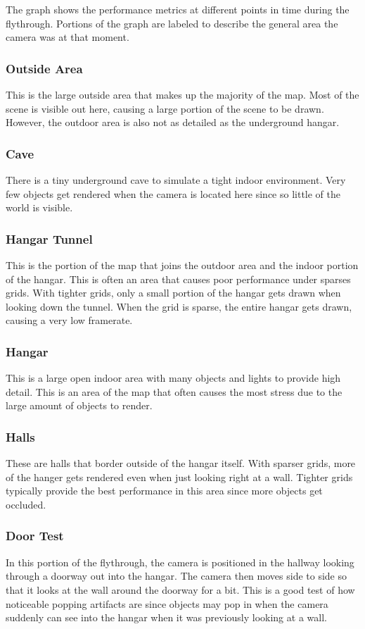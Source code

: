 \documentclass[12pt]{ucthesis}
\begin{document}
The graph shows the performance metrics at different points in time during the flythrough.
Portions of the graph are labeled to describe the general area the camera was at that moment.

\subsubsection{Outside Area}
This is the large outside area that makes up the majority of the map.
Most of the scene is visible out here, causing a large portion of the scene to be drawn.
However, the outdoor area is also not as detailed as the underground hangar.

\subsubsection{Cave}
There is a tiny underground cave to simulate a tight indoor environment.
Very few objects get rendered when the camera is located here since so little of the world is visible.

\subsubsection{Hangar Tunnel}
This is the portion of the map that joins the outdoor area and the indoor portion of the hangar.
This is often an area that causes poor performance under sparses grids.
With tighter grids, only a small portion of the hangar gets drawn when looking down the tunnel.
When the grid is sparse, the entire hangar gets drawn, causing a very low framerate.

\subsubsection{Hangar}
This is a large open indoor area with many objects and lights to provide high detail.
This is an area of the map that often causes the most stress due to the large amount of objects to render.

\subsubsection{Halls}
These are halls that border outside of the hangar itself.
With sparser grids, more of the hanger gets rendered even when just looking right at a wall.
Tighter grids typically provide the best performance in this area since more objects get occluded.

\subsubsection{Door Test}
In this portion of the flythrough, the camera is positioned in the hallway looking through a doorway out into the hangar.
The camera then moves side to side so that it looks at the wall around the doorway for a bit.
This is a good test of how noticeable popping artifacts are since objects may pop in when the camera suddenly can see into the hangar when it was previously looking at a wall.
\end{document}
